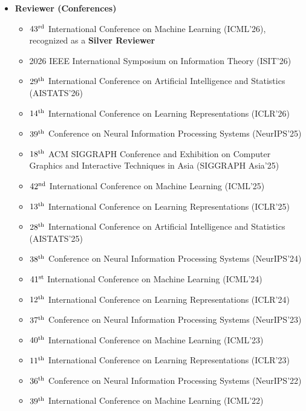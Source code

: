 \documentclass[10pt,letter]{article}
\begin{document}
\begin{small}
\begin{itemize}
	\item \textbf{Reviewer (Conferences)}
    \begin{itemize}
        \item $43\textsuperscript{rd}$ International Conference on Machine Learning (ICML'26), recognized as a \textbf{Silver Reviewer}
        \item 2026 IEEE International Symposium on Information Theory (ISIT'26)
        \item $29\textsuperscript{th}$ International Conference on Artificial Intelligence and Statistics (AISTATS'26)
        \item $14\textsuperscript{th}$ International Conference on Learning Representations (ICLR'26)
        \item $39\textsuperscript{th}$ Conference on Neural Information Processing Systems (NeurIPS'25)
        \item $18\textsuperscript{th}$ ACM SIGGRAPH Conference and Exhibition on Computer Graphics and Interactive Techniques in Asia (SIGGRAPH Asia'25)
        \item $42\textsuperscript{nd}$ International Conference on Machine Learning (ICML'25)
        \item $13\textsuperscript{th}$ International Conference on Learning Representations (ICLR'25)
        \item $28\textsuperscript{th}$ International Conference on Artificial Intelligence and Statistics (AISTATS'25)
        \item $38\textsuperscript{th}$ Conference on Neural Information Processing Systems (NeurIPS'24)
        \item $41\textsuperscript{st}$ International Conference on Machine Learning (ICML'24)
        \item $12\textsuperscript{th}$ International Conference on Learning Representations (ICLR'24)
        \item $37\textsuperscript{th}$ Conference on Neural Information Processing Systems (NeurIPS'23)
        \item $40\textsuperscript{th}$ International Conference on Machine Learning (ICML'23)
        \item $11\textsuperscript{th}$ International Conference on Learning Representations (ICLR'23)
        \item $36\textsuperscript{th}$ Conference on Neural Information Processing Systems (NeurIPS'22)
        \item $39\textsuperscript{th}$ International Conference on Machine Learning (ICML'22)

\end{itemize}
\end{itemize}
\end{small}
\end{document}
